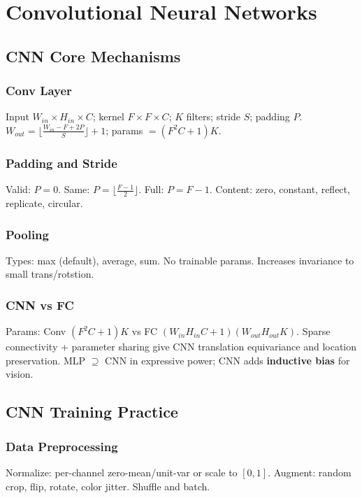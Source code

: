 \section{Convolutional Neural Networks}
\subsection{CNN Core Mechanisms}
\subsubsection*{Conv Layer}
Input $W_{in}\times H_{in}\times C$; kernel $F\times F\times C$; $K$ filters; stride $S$; padding $P$.
$W_{out}=\lfloor\frac{W_{in}-F+2P}{S}\rfloor+1$; params $=(F^2C+1)K$.

\subsubsection*{Padding and Stride}
Valid: $P=0$. Same: $P=\lfloor\frac{F-1}{2}\rfloor$. Full: $P=F-1$.
Content: zero, constant, reflect, replicate, circular.

\subsubsection*{Pooling}
Types: max (default), average, sum. No trainable params.
Increases invariance to small trans/rotstion.

\subsubsection*{CNN vs FC}
Params: Conv $(F^2C+1)K$ vs FC $(W_{in}H_{in}C+1)(W_{out}H_{out}K)$.
Sparse connectivity + parameter sharing give CNN translation equivariance and location preservation.
MLP $\supseteq$ CNN in expressive power; CNN adds \textbf{inductive bias} for vision.

\subsection{CNN Training Practice}
\subsubsection*{Data Preprocessing}
Normalize: per-channel zero-mean/unit-var or scale to $[0,1]$. Augment: random crop, flip, rotate, color jitter. Shuffle and batch.

